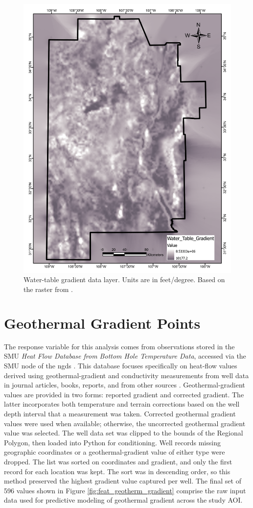 \begin{figure}[H]
\centering
\includegraphics[width=0.75\linewidth]{templates/images/Figure-WTGradient.pdf}
\caption[Water-table gradient data layer]{Water-table gradient data layer. Units are in feet/degree. Based on the raster from \protect\citet{bielicki_hydrogeolgic_2015}.}
\label{fig:feat_wt_gradient}
\end{figure}

\section{Geothermal Gradient Points}\label{app:pts_geothermal_gradient}

The response variable for this analysis comes from observations stored in the SMU \textit{Heat Flow Database from Bottom Hole Temperature Data}, accessed via the SMU node of the \acrlong{ngds} \citep{smu_geothermal_2021}. This database focuses specifically on heat-flow values derived using geothermal-gradient and conductivity measurements from well data in journal articles, books, reports, and from other sources \citep{blackwell_geothermal_2014}. Geothermal-gradient values are provided in two forms: reported gradient and corrected gradient. The latter incorporates both temperature and terrain corrections based on the well depth interval that a measurement was taken. Corrected geothermal gradient values were used when available; otherwise, the uncorrected geothermal gradient value was selected. The well data set was clipped to the bounds of the Regional Polygon, then loaded into Python for conditioning. Well records missing geographic coordinates or a geothermal-gradient value of either type were dropped. The list was sorted on coordinates and gradient, and only the first record for each location was kept. The sort was in descending order, so this method preserved the highest gradient value captured per well. The final set of 596 values shown in Figure \ref{fig:feat_geotherm_gradient} comprise the raw input data used for predictive modeling of geothermal gradient across the study AOI.

